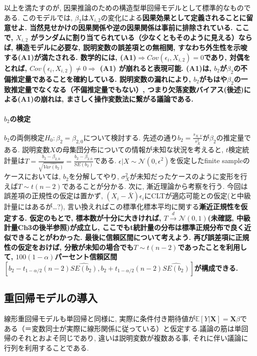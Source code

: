 \documentclass[paper=a4paper,fontsize=10pt]{jlreq}
\begin{document}
以上を満たすのが, 因果推論のための構造型単回帰モデルとして標準的なものである. このモデルでは, $\beta_2$は$X_{i,2}$の変化による\rmfamily\mcfamily\bfseries{因果効果}\mdseries として定義されることに留意せよ. 当然見せかけの因果関係や逆の因果関係は事前に排除されている. ここで, $X_{i,2}$ がランダムに割り当てられている（少なくともそのように見える）ならば, 構造モデルに必要な, 説明変数の誤差項との無相関, すなわち\textbf{外生性}を示唆する\rmfamily\mcfamily\bfseries{(A1)}\mdseries が満たされる. 数学的には, (A1)$\Rightarrow Cov(\epsilon_i, X_{i, 2})=0$であり, 対偶をとれば, $Cov(\epsilon_i, X_{i, 2})\neq 0\Rightarrow$ (A1) が崩れると表現可能. (A1)は, $b_2$が$\beta_2$の不偏推定量であることを確約している. 説明変数の漏れにより, $b_2$がもはや$\beta_2$の一致推定量でなくなる（不偏推定量でもない）, つまり\rmfamily\mcfamily\bfseries{欠落変数バイアス}\mdseries (後述)による(A1)の崩れは, まさしく操作変数法に繋がる議論である.\\

\paragraph{$b_2$の検定}
$b_2$の両側検定$H_0: \beta_2=\beta_{2,0}$について検討する. 先述の通り$b_2=\frac{s_{X,Y}}{s^{2}_{X}}$が$\beta_2$の推定量である. 説明変数$X$の母集団分布についての情報が未知な状況を考えると, $t$検定統計量は$T=\frac{b_2-\beta_{2,0}}{\sqrt{\hat{Var(b_2)}}}=\frac{b_2-\beta_{2,0}}{SE(b_2)}$である. $\epsilon|X \sim \mathcal{N}(0,\epsilon^2)$を仮定したfinite sampleのケースにおいては, $b_2$を分解してやり, $\sigma_X^2$が未知だったケースのように変形を行えば$T \sim t(n-2)$であることが分かる. 次に, 漸近理論から考察を行う. 今回は誤差項の正規性の仮定は置かず, $(X_i-\bar{X})\epsilon_i$にCLTが適応可能との仮定(と中級計量にはあるが\dots?), 言い換えればこの標準化標本平均に関する\rmfamily\mcfamily\bfseries{漸近正規性}\mdseries を仮定する. 仮定のもとで, 標本数が十分に大きければ, $T \overset{d}{\to} \mathcal{N}(0,1)$\rmfamily\mcfamily\bfseries{(未確認, 中級計量Ch3の後半参照)}\mdseries が成立し, ここでもt統計量の分布は標準正規分布で良く近似できることがわかった. 最後に信頼区間について考えよう. 再び誤差項に正規性の仮定をおけば, 分散が未知の場合でも$T \sim t(n-2)$であったことを利用して, $100(1-\alpha)$パーセント信頼区間$[b_2 - t_{1-\alpha / 2}(n-2) \hat{SE(b_2)}, b_2 + t_{1-\alpha / 2}(n-2) \hat{SE(b_2)}]$が構成できる.\\

\subsection{重回帰モデルの導入}
線形重回帰モデルも単回帰と同様に, 実際に条件付き期待値が$\mathbb{E}[Y|\mathbf{X}]=\mathbf{X}\beta$である（＝変数同士が実際に線形関係に従っている）と仮定する.議論の筋は単回帰のそれとおよそ同じであり, 違いは説明変数が複数ある事, それに伴い議論に行列を利用することである. \\
\end{document}
